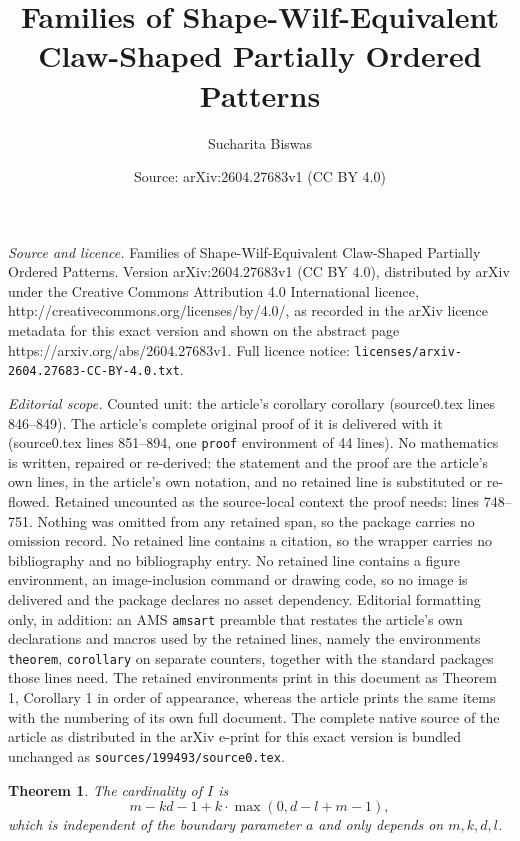 \documentclass[10pt,a4paper]{amsart}
\title{Families of Shape-Wilf-Equivalent Claw-Shaped Partially Ordered Patterns}
\author{Sucharita Biswas}
\date{Source: arXiv:2604.27683v1 (CC BY 4.0)}
\newtheorem{theorem}{Theorem}
\begin{document}
\maketitle

\noindent\emph{Source and licence.} Families of Shape-Wilf-Equivalent Claw-Shaped Partially Ordered Patterns. Version arXiv:2604.27683v1 (CC BY 4.0), distributed by arXiv under the Creative Commons Attribution 4.0 International licence, http://creativecommons.org/licenses/by/4.0/, as recorded in the arXiv licence metadata for this exact version and shown on the abstract page https://arxiv.org/abs/2604.27683v1. Full licence notice: \texttt{licenses/arxiv-2604.27683-CC-BY-4.0.txt}.\par\smallskip

\noindent\textit{Editorial scope.} Counted unit: the article's corollary corollary (source0.tex lines 846--849). The article's complete original proof of it is delivered with it (source0.tex lines 851--894, one \texttt{proof} environment of 44 lines). No mathematics is written, repaired or re-derived: the statement and the proof are the article's own lines, in the article's own notation, and no retained line is substituted or re-flowed.  Retained uncounted as the source-local context the proof needs: lines 748--751.  Nothing was omitted from any retained span, so the package carries no omission record.  No retained line contains a citation, so the wrapper carries no bibliography and no bibliography entry.  No retained line contains a figure environment, an image-inclusion command or drawing code, so no image is delivered and the package declares no asset dependency.  Editorial formatting only, in addition: an AMS \texttt{amsart} preamble that restates the article's own declarations and macros used by the retained lines, namely the environments \texttt{theorem}, \texttt{corollary} on separate counters, together with the standard packages those lines need.  The retained environments print in this document as Theorem 1, Corollary 1 in order of appearance, whereas the article prints the same items with the numbering of its own full document.  The complete native source of the article as distributed in the arXiv e-print for this exact version is bundled unchanged as \texttt{sources/199493/source0.tex}.
\begin{theorem}\label{size_I}
    The cardinality of $I$ is 
    $$m - kd - 1 + k \cdot \max(0, d - l + m - 1),$$ which is independent of the boundary parameter $a$ and only depends on $m,k,d,l$.
\end{theorem}
\end{document}
